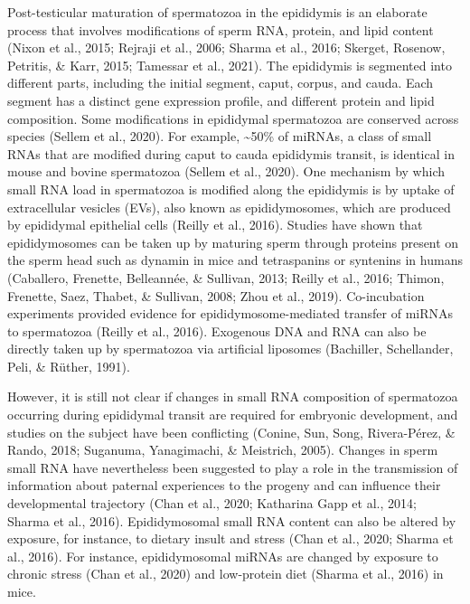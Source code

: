 \documentclass[12pt,twoside]{reedthesis}
\begin{document}
Post-testicular maturation of spermatozoa in the epididymis is an elaborate process that involves modifications of sperm RNA, protein, and lipid content (Nixon et al., 2015; Rejraji et al., 2006; Sharma et al., 2016; Skerget, Rosenow, Petritis, \& Karr, 2015; Tamessar et al., 2021). The epididymis is segmented into different parts, including the initial segment, caput, corpus, and cauda. Each segment has a distinct gene expression profile, and different protein and lipid composition. Some modifications in epididymal spermatozoa are conserved across species (Sellem et al., 2020). For example, \textasciitilde50\% of miRNAs, a class of small RNAs that are modified during caput to cauda epididymis transit, is identical in mouse and bovine spermatozoa (Sellem et al., 2020). One mechanism by which small RNA load in spermatozoa is modified along the epididymis is by uptake of extracellular vesicles (EVs), also known as epididymosomes, which are produced by epididymal epithelial cells (Reilly et al., 2016). Studies have shown that epididymosomes can be taken up by maturing sperm through proteins present on the sperm head such as dynamin in mice and tetraspanins or syntenins in humans (Caballero, Frenette, Belleannée, \& Sullivan, 2013; Reilly et al., 2016; Thimon, Frenette, Saez, Thabet, \& Sullivan, 2008; Zhou et al., 2019). Co-incubation experiments provided evidence for epididymosome-mediated transfer of miRNAs to spermatozoa (Reilly et al., 2016). Exogenous DNA and RNA can also be directly taken up by spermatozoa via artificial liposomes (Bachiller, Schellander, Peli, \& Rüther, 1991).

However, it is still not clear if changes in small RNA composition of spermatozoa occurring during epididymal transit are required for embryonic development, and studies on the subject have been conflicting (Conine, Sun, Song, Rivera-Pérez, \& Rando, 2018; Suganuma, Yanagimachi, \& Meistrich, 2005). Changes in sperm small RNA have nevertheless been suggested to play a role in the transmission of information about paternal experiences to the progeny and can influence their developmental trajectory (Chan et al., 2020; Katharina Gapp et al., 2014; Sharma et al., 2016). Epididymosomal small RNA content can also be altered by exposure, for instance, to dietary insult and stress (Chan et al., 2020; Sharma et al., 2016). For instance, epididymosomal miRNAs are changed by exposure to chronic stress (Chan et al., 2020) and low-protein diet (Sharma et al., 2016) in mice.
\end{document}
